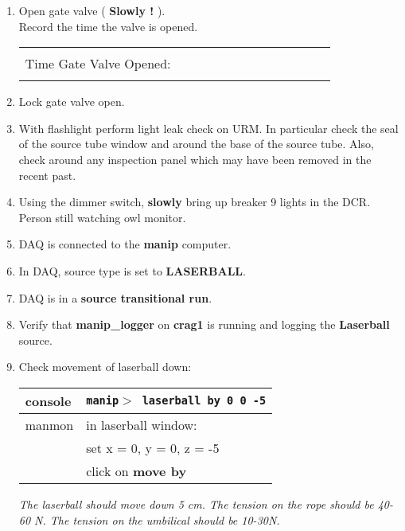 \begin{enumerate}
\item\checkbox Open gate valve ( {\bf Slowly !} ).\\
  Record the time the valve is opened.
     \begin{center}
     \begin{tabular}{|l|}
     \hline
      \\
     Time Gate Valve Opened:~~~~~~~~~~~~~~~~~~~~~~~~\\
      \\
     \hline
     \end{tabular}
     \end{center}

 \item\checkbox Lock gate valve open.

 \item\checkbox With flashlight perform light leak check on URM.  In particular
   check the seal of the source tube window and around the base of the source tube.
   Also, check around any inspection panel which may have been removed in the recent past.

 \item\checkbox Using the dimmer switch, { \bf slowly } bring up breaker 9 lights in
   the DCR.  Person still watching owl monitor.


 \item\checkbox DAQ is connected to the {\bf manip} computer.

 \item \checkbox In DAQ, source type is set to {\bf LASERBALL}.

 \item\checkbox DAQ is in a {\bf source transitional run}.

 \item \checkbox Verify that {\bf manip\_logger} on {\bf crag1}
                 is running and logging the {\bf Laserball}  source.

 \item\checkbox Check movement of laserball down:
  \begin{center}
  \begin{tabular}{|l|l|}
  \hline
  console & {\tt manip$>$ laserball by 0 0 -5} \\
  \hline
  manmon  & in laserball window: \\
          & set x = 0, y = 0, z = -5\\
          & click on {\bf move by} \\
  \hline
  \end{tabular}
  \end{center}
  \small
  {\em 
    The laserball should move down 5 cm.  The tension on the rope
    should be 40-60 N.  The tension on the umbilical should be
    10-30N.
  }
  \normalsize


\end{enumerate}
